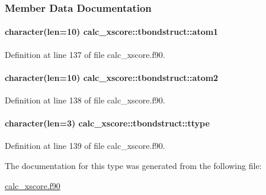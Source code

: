 \subsubsection{Member Data Documentation}
\hypertarget{structcalc__xscore_1_1tbondstruct_a808811a29fe2ba3f61e3fbfb0df57b95}{
\paragraph[{atom1}]{\setlength{\rightskip}{0pt plus 5cm}character(len=10) calc\-\_\-xscore\-::tbondstruct\-::atom1}}\label{structcalc__xscore_1_1tbondstruct_a808811a29fe2ba3f61e3fbfb0df57b95}


Definition at line 137 of file calc\-\_\-xscore.\-f90.

\hypertarget{structcalc__xscore_1_1tbondstruct_a74934378fb21b88c85aa7939623f7456}{
\paragraph[{atom2}]{\setlength{\rightskip}{0pt plus 5cm}character(len=10) calc\-\_\-xscore\-::tbondstruct\-::atom2}}\label{structcalc__xscore_1_1tbondstruct_a74934378fb21b88c85aa7939623f7456}


Definition at line 138 of file calc\-\_\-xscore.\-f90.

\hypertarget{structcalc__xscore_1_1tbondstruct_a4e1125f95b5019636e97da68c5932c83}{
\paragraph[{ttype}]{\setlength{\rightskip}{0pt plus 5cm}character(len=3) calc\-\_\-xscore\-::tbondstruct\-::ttype}}\label{structcalc__xscore_1_1tbondstruct_a4e1125f95b5019636e97da68c5932c83}


Definition at line 139 of file calc\-\_\-xscore.\-f90.



The documentation for this type was generated from the following file\-:\begin{DoxyCompactItemize}
\item 
\hyperlink{calc__xscore_8f90}{calc\-\_\-xscore.\-f90}\end{DoxyCompactItemize}

